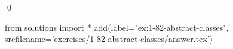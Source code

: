
\begin{ex}
  \label{ex:1-82-abstract-classes}
  
  \qed
\end{ex}
\begin{python0}
from solutions import *
add(label="ex:1-82-abstract-classes",
    srcfilename='exercises/1-82-abstract-classes/answer.tex')
\end{python0}
